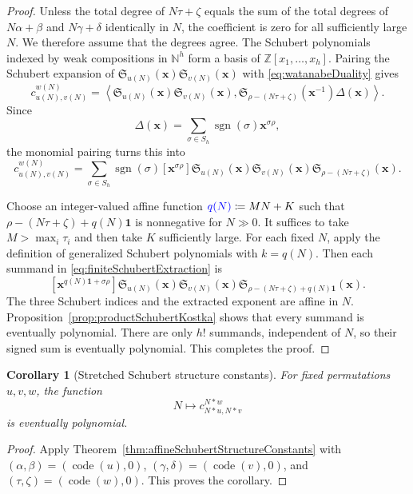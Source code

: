 \documentclass[11pt,reqno]{amsart}
\newtheorem{corollary}[theorem]{Corollary}
\theoremstyle{definition}
\DeclareMathOperator{\code}{code}
\newcommand{\setN}{\mathbb{N}}
\newcommand{\setZ}{\mathbb{Z}}
\newcommand{\xvec}{\mathbf{x}}
\newcommand{\symS}{S}
\newcommand{\schubertS}{\mathfrak{S}}
\newcommand{\stretchop}{\mathbin{\ast}}
\newcommand{\stretchperm}[2]{#1\stretchop #2}
\newcommand{\defin}[1]{%
  \relax\ifmmode%
  \textcolor{blue}{#1}%
  \else\textcolor{blue}{\emph{#1}}%
  \fi%
}
\begin{document}
\begin{proof}
Unless the total degree of \(N\tau+\zeta\) equals the sum of the total degrees
of \(N\alpha+\beta\) and \(N\gamma+\delta\) identically in \(N\), the
coefficient is zero for all sufficiently large \(N\).  We therefore assume
that the degrees agree.
The Schubert polynomials indexed by weak compositions in \(\setN^h\) form a
basis of \(\setZ[x_1,\dotsc,x_h]\).  Pairing the Schubert expansion of
\(\schubertS_{u(N)}(\xvec)\schubertS_{v(N)}(\xvec)\) with
\eqref{eq:watanabeDuality} gives
\[
c_{u(N),v(N)}^{w(N)}
=
\left\langle
\schubertS_{u(N)}(\xvec)\schubertS_{v(N)}(\xvec),
\schubertS_{\rho-(N\tau+\zeta)}(\xvec^{-1})\Delta(\xvec)
\right\rangle.
\]
Since
\[
\Delta(\xvec)
=\sum_{\sigma\in\symS_h}
\operatorname{sgn}(\sigma)\xvec^{\sigma\rho},
\]
the monomial pairing turns this into
\begin{equation}
\label{eq:finiteSchubertExtraction}
c_{u(N),v(N)}^{w(N)}
=
\sum_{\sigma\in\symS_h}
\operatorname{sgn}(\sigma)
[\xvec^{\sigma\rho}]
\schubertS_{u(N)}(\xvec)
\schubertS_{v(N)}(\xvec)
\schubertS_{\rho-(N\tau+\zeta)}(\xvec).
\end{equation}

Choose an integer-valued affine function
\(\defin{q(N)}\coloneqq MN+K\) such that
\(\rho-(N\tau+\zeta)+q(N)\mathbf 1\) is nonnegative for \(N\gg0\).
It suffices to take \(M>\max_i\tau_i\) and then take \(K\) sufficiently
large.  For each fixed \(N\), apply the definition of generalized Schubert
polynomials with \(k=q(N)\).  Then each summand in
\eqref{eq:finiteSchubertExtraction} is
\[
[\xvec^{q(N)\mathbf 1+\sigma\rho}]
\schubertS_{u(N)}(\xvec)
\schubertS_{v(N)}(\xvec)
\schubertS_{\rho-(N\tau+\zeta)+q(N)\mathbf 1}(\xvec).
\]
The three Schubert indices and the extracted exponent are affine in \(N\).
Proposition~\ref{prop:productSchubertKostka} shows that every summand is
eventually polynomial.  There are only \(h!\) summands, independent of \(N\),
so their signed sum is eventually polynomial.  This completes the proof.
\end{proof}

\begin{corollary}[Stretched Schubert structure constants]
\label{cor:stretchedSchubertStructureConstants}
For fixed permutations \(u,v,w\), the function
\[
N\longmapsto
c_{\stretchperm{N}{u},\stretchperm{N}{v}}^{\stretchperm{N}{w}}
\]
is eventually polynomial.
\end{corollary}

\begin{proof}
Apply Theorem~\ref{thm:affineSchubertStructureConstants} with
\((\alpha,\beta)=(\code(u),0)\),
\((\gamma,\delta)=(\code(v),0)\), and
\((\tau,\zeta)=(\code(w),0)\).  This proves the corollary.
\end{proof}
\end{document}
